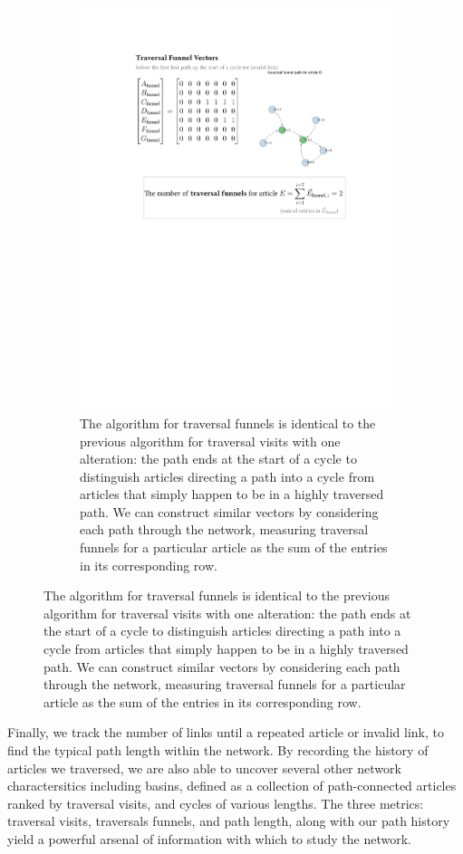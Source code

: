 \documentclass[twoside]{article}
\begin{document}
\begin{figure}[H]
\centering
    \caption{traversal funnel algorithm on a sample network}
\begin{subfigure}[b]{\textwidth}
    \includegraphics[width=\textwidth]{graphics/traversal_funnel_algo_figure.pdf}
    \caption{The algorithm for traversal funnels is identical to the previous algorithm for traversal visits with one alteration: the path ends at the start of a cycle to distinguish articles directing a path into a cycle from articles that simply happen to be in a highly traversed path. We can construct similar vectors by considering each path through the network, measuring traversal funnels for a particular article as the sum of the entries in its corresponding row.}
\end{subfigure}
\end{figure}

Finally, we track the number of links until a repeated article or invalid link, to find the typical path length within the network.
By recording the history of articles we traversed, we are also able to uncover several other network charactersitics including basins, defined as a collection of path-connected articles ranked by traversal visits, and cycles of various lengths.
The three metrics: traversal visits, traversals funnels, and path length, along with our path history
yield a powerful arsenal of information with which to study the network. 
\end{document}
